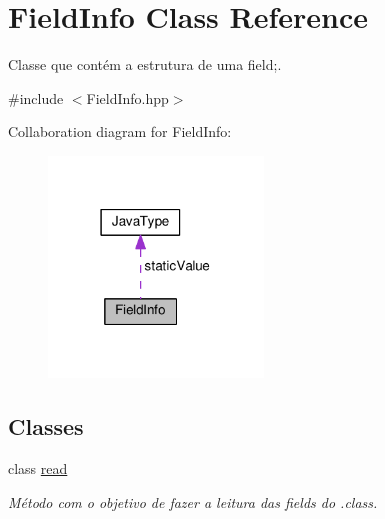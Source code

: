 \hypertarget{classFieldInfo}{}\section{Field\+Info Class Reference}
\label{classFieldInfo}


Classe que contém a estrutura de uma field;.  




{\ttfamily \#include $<$Field\+Info.\+hpp$>$}



Collaboration diagram for Field\+Info\+:\nopagebreak
\begin{figure}[H]
\begin{center}
\leavevmode
\includegraphics[width=162pt]{classFieldInfo__coll__graph}
\end{center}
\end{figure}
\subsection*{Classes}
\begin{DoxyCompactItemize}
\item 
class \hyperlink{classFieldInfo_1_1read}{read}
\begin{DoxyCompactList}\small\item\em Método com o objetivo de fazer a leitura das fields do .class. \end{DoxyCompactList}\end{DoxyCompactItemize}
